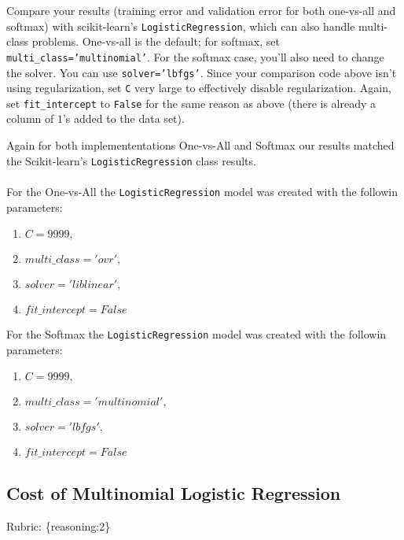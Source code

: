 \documentclass{article}
\def\rubric#1{\gre{Rubric: \{#1\}}}{}
\def\gre#1{{\color{gre}#1}}
\def\ans#1{{\color{ans}#1}}
\begin{document}
Compare your results (training error and validation error for both one-vs-all and softmax) with scikit-learn's \texttt{LogisticRegression},
which can also handle multi-class problems.
One-vs-all is the default; for softmax, set \texttt{multi\string_class='multinomial'}. For the softmax case,
you'll also need to change the solver. You can use \texttt{solver='lbfgs'}.
Since your comparison code above isn't using regularization, set \texttt{C} very large to effectively disable regularization.
Again, set \texttt{fit\string_intercept} to \texttt{False} for the same reason as above (there is already a column of $1$'s added to the data set). \\
\ans{
    Again for both implemententations One-vs-All and Softmax our results matched the Scikit-learn's 
    \texttt{LogisticRegression} class results. \\ \\
    For the One-vs-All the \texttt{LogisticRegression} model was created with the followin parameters:
    \begin{enumerate}
        \item $C=9999, $
        \item $multi\_class='ovr', $
        \item $solver='liblinear', $
        \item $fit\_intercept=False$
    \end{enumerate}
    For the Softmax the \texttt{LogisticRegression} model was created with the followin parameters:
    \begin{enumerate}
        \item $C=9999, $
        \item $multi\_class='multinomial', $
        \item $solver='lbfgs', $
        \item $fit\_intercept=False$
    \end{enumerate}
}

\subsection{Cost of Multinomial Logistic Regression}
\rubric{reasoning:2}
\end{document}
